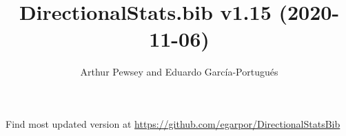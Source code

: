 \documentclass[10pt]{article}
\title{DirectionalStats.bib v1.15 (2020-11-06)}
\author{Arthur Pewsey and Eduardo García-Portugués}
\date{}
\begin{document}
\maketitle

Find most updated version at \url{https://github.com/egarpor/DirectionalStatsBib}

\nocite{*}

\setlength\bibsep{0cm}
\setlength\bibhang{0.25cm}



\end{document}
